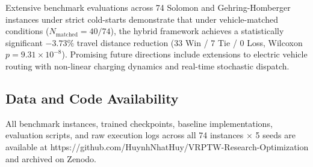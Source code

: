 \documentclass{ieeeaccess}
\begin{document}
Extensive benchmark evaluations across 74 Solomon and Gehring-Homberger instances under strict cold-starts demonstrate that under vehicle-matched conditions ($N_{\text{matched}}=40/74$), the hybrid framework achieves a statistically significant $-3.73\%$ travel distance reduction (33 Win / 7 Tie / 0 Loss, Wilcoxon $p=9.31 \times 10^{-8}$). Promising future directions include extensions to electric vehicle routing with non-linear charging dynamics and real-time stochastic dispatch.

\subsection{Data and Code Availability}
\label{sec:data_code_avail}
All benchmark instances, trained checkpoints, baseline implementations, evaluation scripts, and raw execution logs across all 74 instances $\times$ 5 seeds are available at \textsf{\small https://github.com/HuynhNhatHuy/VRPTW-Research-Optimization} and archived on Zenodo.
\end{document}
